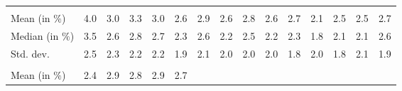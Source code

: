 \begin{tabular}{lllllllllllllll}
  \multicolumn{1}{r}{} &
  \multicolumn{1}{r}{} &
  \multicolumn{1}{r}{} &
  \multicolumn{1}{r}{} &
  \multicolumn{1}{r}{} &
  \multicolumn{1}{r}{} &
  \multicolumn{1}{r}{} &
  \multicolumn{1}{r}{} &
  \multicolumn{1}{r}{} &
  \multicolumn{1}{r}{} \\
\multicolumn{1}{l}{\hspace{2em}Mean (in $\%$)} &
  \multicolumn{1}{|r}{4.0} &
  \multicolumn{1}{r}{3.0} &
  \multicolumn{1}{r}{3.3} &
  \multicolumn{1}{r}{3.0} &
  \multicolumn{1}{r}{2.6} &
  \multicolumn{1}{r}{2.9} &
  \multicolumn{1}{r}{2.6} &
  \multicolumn{1}{r}{2.8} &
  \multicolumn{1}{r}{2.6} &
  \multicolumn{1}{r}{2.7} &
  \multicolumn{1}{r}{2.1} &
  \multicolumn{1}{r}{2.5} &
  \multicolumn{1}{r}{2.5} &
  \multicolumn{1}{r}{2.7} \\
\multicolumn{1}{l}{\hspace{2em}Median (in $\%$)} &
  \multicolumn{1}{|r}{3.5} &
  \multicolumn{1}{r}{2.6} &
  \multicolumn{1}{r}{2.8} &
  \multicolumn{1}{r}{2.7} &
  \multicolumn{1}{r}{2.3} &
  \multicolumn{1}{r}{2.6} &
  \multicolumn{1}{r}{2.2} &
  \multicolumn{1}{r}{2.5} &
  \multicolumn{1}{r}{2.2} &
  \multicolumn{1}{r}{2.3} &
  \multicolumn{1}{r}{1.8} &
  \multicolumn{1}{r}{2.1} &
  \multicolumn{1}{r}{2.1} &
  \multicolumn{1}{r}{2.6} \\
\multicolumn{1}{l}{\hspace{2em}Std. dev.} &
  \multicolumn{1}{|r}{2.5} &
  \multicolumn{1}{r}{2.3} &
  \multicolumn{1}{r}{2.2} &
  \multicolumn{1}{r}{2.2} &
  \multicolumn{1}{r}{1.9} &
  \multicolumn{1}{r}{2.1} &
  \multicolumn{1}{r}{2.0} &
  \multicolumn{1}{r}{2.0} &
  \multicolumn{1}{r}{2.0} &
  \multicolumn{1}{r}{1.8} &
  \multicolumn{1}{r}{2.0} &
  \multicolumn{1}{r}{1.8} &
  \multicolumn{1}{r}{2.1} &
  \multicolumn{1}{r}{1.9} \\
\multicolumn{1}{l}{\hspace{1em}{\textit{Additive term} ($\widehat{t}/\widetilde{p}$)}} &
  \multicolumn{1}{|r}{} &
  \multicolumn{1}{r}{} &
  \multicolumn{1}{r}{} &
  \multicolumn{1}{r}{} &
  \multicolumn{1}{r}{} &
  \multicolumn{1}{r}{} &
  \multicolumn{1}{r}{} &
  \multicolumn{1}{r}{} &
  \multicolumn{1}{r}{} &
  \multicolumn{1}{r}{} &
  \multicolumn{1}{r}{} &
  \multicolumn{1}{r}{} &
  \multicolumn{1}{r}{} &
  \multicolumn{1}{r}{} \\
\multicolumn{1}{l}{\hspace{2em}Mean (in $\%$)} &
  \multicolumn{1}{|r}{2.4} &
  \multicolumn{1}{r}{2.9} &
  \multicolumn{1}{r}{2.8} &
  \multicolumn{1}{r}{2.9} &
  \multicolumn{1}{r}{2.7} &

\end{tabular}
